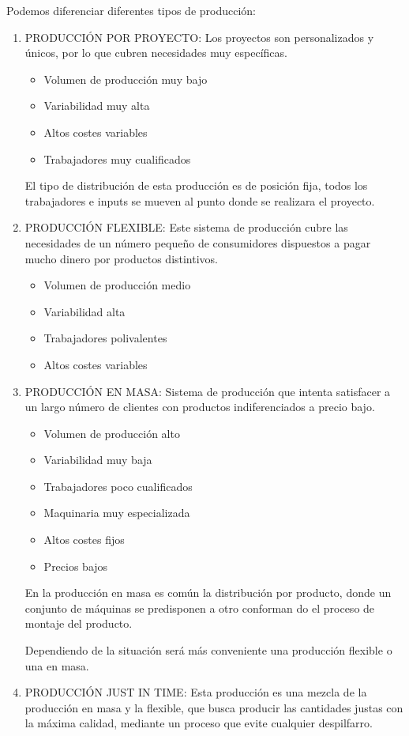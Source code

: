 \documentclass[12pt, twoside, openright]{report} %
\begin{document}
Podemos diferenciar diferentes tipos de producción:
\begin{enumerate}
	\item PRODUCCIÓN POR PROYECTO: Los proyectos son personalizados y únicos, por lo que cubren necesidades muy específicas.
	\begin{itemize}
		\item Volumen de producción muy bajo
		\item Variabilidad muy alta
		\item Altos costes variables
		\item Trabajadores muy cualificados
	\end{itemize}
	El tipo de distribución de esta producción es de posición fija, todos los trabajadores e inputs se mueven al punto donde se realizara el proyecto.
	\item PRODUCCIÓN FLEXIBLE: Este sistema de producción cubre las necesidades de un número pequeño de consumidores dispuestos a pagar mucho dinero por productos distintivos.
	\begin{itemize}
		\item Volumen de producción medio
		\item Variabilidad alta
		\item Trabajadores polivalentes
		\item Altos costes variables
	\end{itemize}
	\pagebreak
	\item PRODUCCIÓN EN MASA: Sistema de producción que intenta satisfacer a un largo número de clientes con productos indiferenciados a precio bajo.
	\begin{itemize}
		\item Volumen de producción alto
		\item Variabilidad muy baja
		\item Trabajadores poco cualificados
		\item Maquinaria muy especializada
		\item Altos costes fijos
		\item Precios bajos
	\end{itemize}
	En la producción en masa es común la distribución por producto, donde un conjunto de máquinas se predisponen a otro conforman do el proceso de montaje del producto.
	
	Dependiendo de la situación será más conveniente una producción flexible o una en masa.
	\item PRODUCCIÓN JUST IN TIME: Esta producción es una mezcla de la producción en masa y la flexible, que busca producir las cantidades justas con la máxima calidad, mediante un proceso que evite cualquier despilfarro.	
\end{enumerate}
\end{document}
